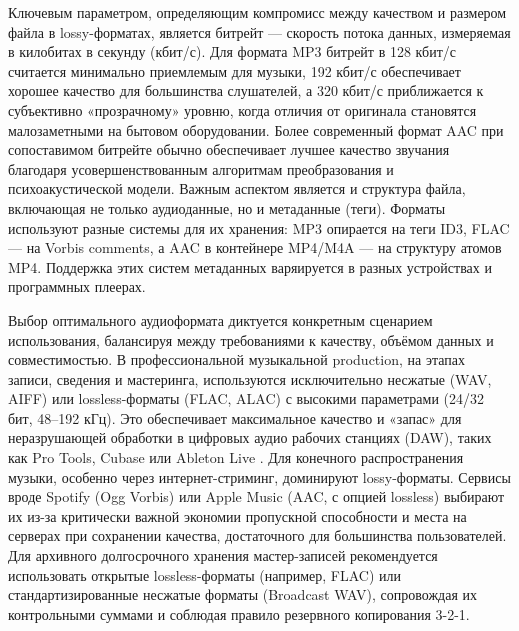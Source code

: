 \documentclass{SibFU-docs}
\begin{document}

Ключевым параметром, определяющим компромисс между качеством и размером файла в lossy-форматах, является битрейт — скорость потока данных, измеряемая в килобитах в секунду (кбит/с). Для формата MP3 битрейт в 128 кбит/с считается минимально приемлемым для музыки, 192 кбит/с обеспечивает хорошее качество для большинства слушателей, а 320 кбит/с приближается к субъективно «прозрачному» уровню, когда отличия от оригинала становятся малозаметными на бытовом оборудовании. Более современный формат AAC при сопоставимом битрейте обычно обеспечивает лучшее качество звучания благодаря усовершенствованным алгоритмам преобразования и психоакустической модели. Важным аспектом является и структура файла, включающая не только аудиоданные, но и метаданные (теги). Форматы используют разные системы для их хранения: MP3 опирается на теги ID3, FLAC — на Vorbis comments, а AAC в контейнере MP4/M4A — на структуру атомов MP4. Поддержка этих систем метаданных варяируется в разных устройствах и программных плеерах.


Выбор оптимального аудиоформата диктуется конкретным сценарием использования, балансируя между требованиями к качеству, объёмом данных и совместимостью. В профессиональной музыкальной production, на этапах записи, сведения и мастеринга, используются исключительно несжатые (WAV, AIFF) или lossless-форматы (FLAC, ALAC) с высокими параметрами (24/32 бит, 48–192 кГц). Это обеспечивает максимальное качество и «запас» для неразрушающей обработки в цифровых аудио рабочих станциях (DAW), таких как Pro Tools, Cubase или Ableton Live \cite{daw_wikipedia}. Для конечного распространения музыки, особенно через интернет-стриминг, доминируют lossy-форматы. Сервисы вроде Spotify (Ogg Vorbis) или Apple Music (AAC, с опцией lossless) выбирают их из-за критически важной экономии пропускной способности и места на серверах при сохранении качества, достаточного для большинства пользователей. Для архивного долгосрочного хранения мастер-записей рекомендуется использовать открытые lossless-форматы (например, FLAC) или стандартизированные несжатые форматы (Broadcast WAV), сопровождая их контрольными суммами и соблюдая правило резервного копирования 3-2-1.

\end{document}
